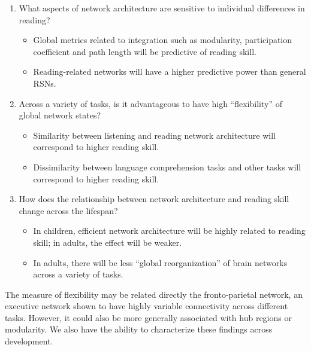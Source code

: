 \begin{enumerate}
	\item What aspects of network architecture are sensitive to individual differences in reading?
	\begin{itemize}
		\item Global metrics related to integration such as modularity, participation coefficient and path length will be predictive of reading skill. 
		\item Reading-related networks will have a higher predictive power than general RSNs.
	\end{itemize}

	\item Across a variety of tasks, is it advantageous to have high ``flexibility'' of global network states? 
	\begin{itemize}
		\item Similarity between listening and reading network architecture will correspond to higher reading skill.
		\item Dissimilarity between language comprehension tasks and other tasks will correspond to higher reading skill.
	\end{itemize}

	\item How does the relationship between network architecture and reading skill change across the lifespan?
	\begin{itemize}
		\item In children, efficient network architecture will be highly related to reading skill; in adults, the effect will be weaker.
		\item In adults, there will be less ``global reorganization'' of brain networks across a variety of tasks.
	\end{itemize}
\end{enumerate}

The measure of flexibility may be related directly the fronto-parietal network, an executive network shown to have highly variable connectivity across different tasks. However, it could also be more generally associated with hub regions or modularity. We also have the ability to characterize these findings across development.


